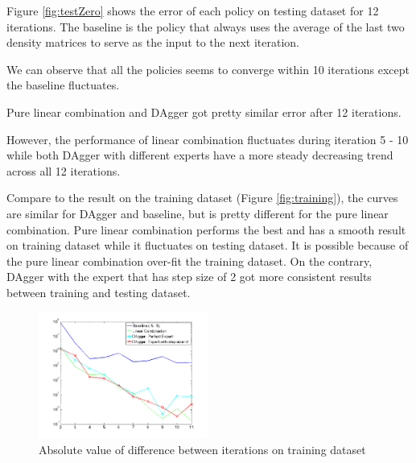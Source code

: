 \documentclass[twoside,11pt]{article}
\begin{document}

Figure \ref{fig:testZero} shows the error of each policy on testing dataset for 12 iterations. The baseline is the policy that always uses the average of the last two density matrices to serve as the input to the next iteration.  


We can observe that all the policies seems to converge within 10 iterations except the baseline fluctuates.


Pure linear combination and DAgger got pretty similar error after 12 iterations.

However, the performance of linear combination fluctuates during iteration 5 - 10 while both DAgger with different experts have a more steady decreasing trend across all 12 iterations. 

Compare to the result on the training dataset (Figure \ref{fig:training}), the curves are similar for DAgger and baseline, but is pretty different for the pure linear combination. Pure linear combination performs the best and has a smooth result on training dataset while it fluctuates on testing dataset. It is possible because of the pure linear combination over-fit the training dataset. On the contrary, DAgger with the expert that has step size of 2 got more consistent results between training and testing dataset.


\begin{figure}[h!]
\center
  \caption{Absolute value of difference between iterations on training dataset}
	\label{fig:converge_training}
    \includegraphics[width=210px]{convergence_Training.png}
\end{figure}
\end{document}
